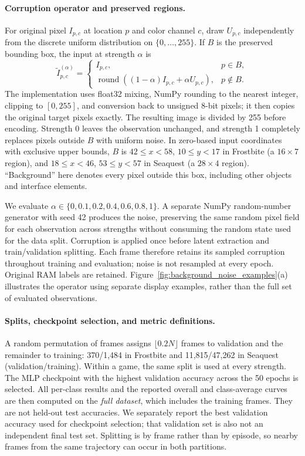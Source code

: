 \documentclass{article} %
\begin{document}
\paragraph{Corruption operator and preserved regions.}
For original pixel $I_{p,c}$ at location $p$ and color channel $c$, draw $U_{p,c}$ independently from the discrete uniform distribution on $\{0,\ldots,255\}$. If $B$ is the preserved bounding box, the input at strength $\alpha$ is
\begin{equation}
\widetilde I_{p,c}^{(\alpha)} =
\begin{cases}
I_{p,c}, & p\in B,\\
\operatorname{round}\!\left((1-\alpha)I_{p,c}+\alpha U_{p,c}\right), & p\notin B.
\end{cases}
\label{eq:probe_background_noise}
\end{equation}
The implementation uses float32 mixing, NumPy rounding to the nearest integer, clipping to $[0,255]$, and conversion back to unsigned 8-bit pixels; it then copies the original target pixels exactly. The resulting image is divided by 255 before encoding. Strength 0 leaves the observation unchanged, and strength 1 completely replaces pixels outside $B$ with uniform noise. In zero-based input coordinates with exclusive upper bounds, $B$ is $42\leq x<58$, $10\leq y<17$ in Frostbite (a $16\times7$ region), and $18\leq x<46$, $53\leq y<57$ in Seaquest (a $28\times4$ region). ``Background'' here denotes every pixel outside this box, including other objects and interface elements.

We evaluate $\alpha\in\{0,0.1,0.2,0.4,0.6,0.8,1\}$. A separate NumPy random-number generator with seed 42 produces the noise, preserving the same random pixel field for each observation across strengths without consuming the random state used for the data split. Corruption is applied once before latent extraction and train/validation splitting. Each frame therefore retains its sampled corruption throughout training and evaluation; noise is not resampled at every epoch. Original RAM labels are retained. Figure~\ref{fig:background_noise_examples}(a) illustrates the operator using separate display examples, rather than the full set of evaluated observations.

\paragraph{Splits, checkpoint selection, and metric definitions.}
A random permutation of frames assigns $\lfloor0.2N\rfloor$ frames to validation and the remainder to training: 370/1,484 in Frostbite and 11,815/47,262 in Seaquest (validation/training). Within a game, the same split is used at every strength. The MLP checkpoint with the highest validation accuracy across the 50 epochs is selected. All per-class results and the reported overall and class-average curves are then computed on the \emph{full dataset}, which includes the training frames. They are not held-out test accuracies. We separately report the best validation accuracy used for checkpoint selection; that validation set is also not an independent final test set. Splitting is by frame rather than by episode, so nearby frames from the same trajectory can occur in both partitions.
\end{document}
